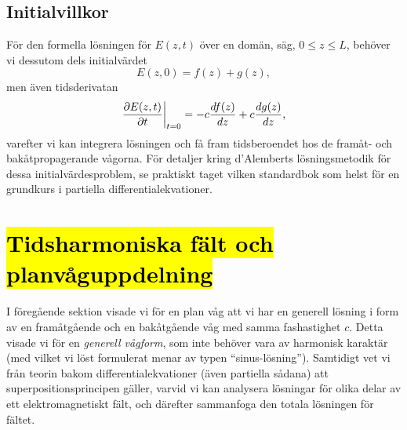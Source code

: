 {{{{{\subsection{Initialvillkor}
F{\"o}r den formella l{\"o}sningen f{\"o}r $E(z,t)$ {\"o}ver en dom{\"a}n,
s{\"a}g, $0\le z\le L$, beh{\"o}ver vi dessutom dels initialv{\"a}rdet
$$
  E(z,0) = f(z) + g(z),
$$
men {\"a}ven tidsderivatan
$$
  {{\partial E(z,t)}\over{\partial t}}\bigg|_{t=0}
    = -c{{df(z)}\over{dz}} + c{{dg(z)}\over{dz}},
$$
varefter vi kan integrera l{\"o}sningen och f{\aa} fram tidsberoendet hos de
fram{\aa}t- och bak{\aa}tpropagerande v{\aa}gorna. F{\"o}r detaljer kring
d'Alemberts l{\"o}sningsmetodik f{\"o}r dessa initialv{\"a}rdesproblem, se
praktiskt taget vilken standardbok som helst f{\"o}r en grundkurs i partiella
differentialekvationer.

\section{{\hl{Tidsharmoniska f{\"a}lt och planv{\aa}guppdelning}}}
I f{\"o}reg{\aa}ende sektion visade vi f{\"o}r en plan v{\aa}g att vi har en
generell l{\"o}sning i form av en fram{\aa}tg{\aa}ende och en
bak{\aa}tg{\aa}ende v{\aa}g med samma fashastighet $c$. Detta visade vi f{\"o}r
en {\it generell v{\aa}gform}, som inte beh{\"o}ver vara av harmonisk
karakt{\"a}r (med vilket vi l{\"o}st formulerat menar av typen
``sinus-l{\"o}sning''). Samtidigt vet vi fr{\aa}n teorin bakom
differentialekvationer ({\"a}ven partiella s{\aa}dana) att
superpositionsprincipen g{\"a}ller, varvid vi kan analysera l{\"o}sningar
f{\"o}r olika delar av ett elektromagnetiskt f{\"a}lt, och d{\"a}refter
sammanfoga den totala l{\"o}sningen f{\"o}r f{\"a}ltet.

}}}}}
